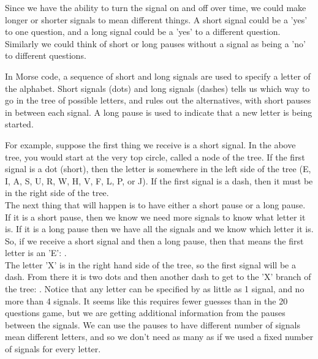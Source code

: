 Since we have the ability to turn the signal on and off over time, we could make longer or shorter signals to mean different things. A short signal could be a 'yes' to one question, and a long signal could be a 'yes' to a different question. Similarly we could think of short or long pauses without a signal as being a 'no' to different questions.

\begin{center}\end{center}

In Morse code, a sequence of short and long signals are used to specify a letter of the alphabet. Short signals (dots) and long signals (dashes) tells us which way to go in the tree of possible letters, and rules out the alternatives, with short pauses in between each signal. A long pause is used to indicate that a new letter is being started.


\begin{center}\end{center}

For example, suppose the first thing we receive is a short signal. In the above tree, you would start at the very top circle, called a node of the tree. If the first signal is a dot (short), then the letter is somewhere in the left side of the tree (E, I, A, S, U, R, W, H, V, F, L, P, or J). If the first signal is a dash, then it must be in the right side of the tree.\\

The next thing that will happen is to have either a short pause or a long pause. If it is a short pause, then we know we need more signals to know what letter it is. If it is a long pause then we have all the signals and we know which letter it is. So, if we receive a short signal and then a long pause, then that means the first letter is an 'E': \mdit.\\

The letter 'X' is in the right hand side of the tree, so the first signal will be a dash. From there it is two dots and then another dash to get to the 'X' branch of the tree: \mdah\mdit\mdit\mdah. Notice that any letter can be specified by as little as 1 signal, and no more than 4 signals. It seems like this requires fewer guesses than in the 20 questions game, but we are getting additional information from the pauses between the signals. We can use the pauses to have different number of signals mean different letters, and so we don't need as many as if we used a fixed number of signals for every letter.

